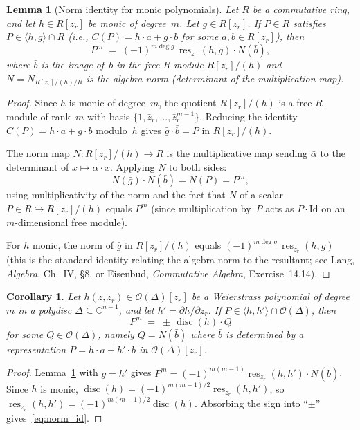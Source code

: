 \documentclass[11pt]{article}
\theoremstyle{plain}
\newtheorem{lemma}[theorem]{Lemma}
\newtheorem{corollary}[theorem]{Corollary}
\theoremstyle{definition}
\newcommand{\C}{\mathbb{C}}
\DeclareMathOperator{\res}{res}
\DeclareMathOperator{\disc}{disc}
\begin{document}
\begin{lemma}[Norm identity for monic polynomials]
\label{lem:norm_identity}
Let $R$ be a commutative ring, and let $h \in R[z_r]$ be monic of
degree~$m$.  Let $g \in R[z_r]$.  If $P \in R$ satisfies
$P \in \langle h, g \rangle \cap R$ (i.e., $C(P) = h \cdot a + g \cdot b$
for some $a, b \in R[z_r]$), then
\[
  P^m \;=\; (-1)^{m \deg g}\, \res_{z_r}(h, g) \cdot N(\bar{b}),
\]
where $\bar{b}$ is the image of~$b$ in the free $R$-module
$R[z_r]/(h)$ and $N = N_{R[z_r]/(h)/R}$ is the algebra norm
(determinant of the multiplication map).
\end{lemma}
\begin{proof}
Since $h$ is monic of degree~$m$, the quotient $R[z_r]/(h)$ is a free
$R$-module of rank~$m$ with basis $\{1, \bar{z}_r, \ldots,
\bar{z}_r^{m-1}\}$.  Reducing the identity $C(P) = h \cdot a + g \cdot b$
modulo~$h$ gives $\bar{g} \cdot \bar{b} = P$ in $R[z_r]/(h)$.

The norm map $N : R[z_r]/(h) \to R$ is the multiplicative map sending
$\bar{\alpha}$ to the determinant of $x \mapsto \bar{\alpha} \cdot x$.
Applying $N$ to both sides:
\[
  N(\bar{g}) \cdot N(\bar{b}) = N(P) = P^m,
\]
using multiplicativity of the norm and the fact that $N$ of a scalar
$P \in R \hookrightarrow R[z_r]/(h)$ equals $P^m$ (since multiplication
by~$P$ acts as $P \cdot \mathrm{Id}$ on an $m$-dimensional free module).

For $h$ monic, the norm of $\bar{g}$ in $R[z_r]/(h)$ equals
$(-1)^{m \deg g}\,\res_{z_r}(h, g)$ (this is the standard identity
relating the algebra norm to the resultant; see Lang,
\emph{Algebra}, Ch.~IV, \S8, or Eisenbud, \emph{Commutative Algebra},
Exercise~14.14).
\end{proof}

\begin{corollary}
\label{cor:norm_weierstrass}
Let $h(z, z_r) \in \mathcal{O}(\Delta)[z_r]$ be a Weierstrass polynomial
of degree~$m$ in a polydisc $\Delta \subseteq \C^{n-1}$, and let
$h' = \partial h / \partial z_r$.  If
$P \in \langle h, h' \rangle \cap \mathcal{O}(\Delta)$, then
\begin{equation}
\label{eq:norm_id}
  P^m \;=\; \pm\,\disc(h) \cdot Q
\end{equation}
for some $Q \in \mathcal{O}(\Delta)$, namely $Q = N(\bar{b})$ where
$\bar{b}$ is determined by a representation
$P = h \cdot a + h' \cdot b$ in $\mathcal{O}(\Delta)[z_r]$.
\end{corollary}
\begin{proof}
Lemma~\ref{lem:norm_identity} with $g = h'$ gives
$P^m = (-1)^{m(m-1)} \res_{z_r}(h, h') \cdot N(\bar{b})$.
Since $h$ is monic,
$\disc(h) = (-1)^{m(m-1)/2} \res_{z_r}(h, h')$,
so $\res_{z_r}(h, h') = (-1)^{m(m-1)/2} \disc(h)$.
Absorbing the sign into ``$\pm$'' gives~\eqref{eq:norm_id}.
\end{proof}
\end{document}
